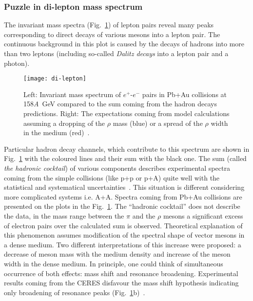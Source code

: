       \subsubsection{Puzzle in di-lepton mass spectrum}
        The invariant mass spectra (Fig.~\ref{fig:di-lepton}) of lepton pairs reveal many peaks corresponding to direct decays of various mesons into a lepton pair.
        The continuous background in this plot is caused by the decays of hadrons into more than two leptons (including so-called \textit{Dalitz decays} into a lepton pair and a photon).
        \begin{figure}[h]
          \centering
          \texttt{[image: di-lepton]}
          \caption{Left: Invariant mass spectrum of $e^{+}$-$e^{-}$ pairs in Pb+Au collisions at 158\textit{A}~GeV compared to the sum coming from the hadron decays predictions. Right: The expectations coming from model calculations assuming a dropping of the $\rho$ mass (blue) or a spread of the $\rho$ width in the medium (red)~\cite{marin}.}
          \label{fig:di-lepton}
        \end{figure}
        Particular hadron decay channels, which contribute to this spectrum are shown in Fig.~\ref{fig:di-lepton} with the coloured lines and their sum with the black one.
        The sum (called \textit{the hadronic cocktail}) of various components describes experimental spectra coming from the simple collisions (like p+p or p+A) quite well with the statistical and systematical uncertainties~\cite{bartke}.
        This situation is different considering more complicated systems i.e. A+A.
        Spectra coming from Pb+Au collisions are presented on the plots in the Fig.~\ref{fig:di-lepton}.
        The ``hadronic cocktail'' does not describe the data, in the mass range between the $\pi$ and the $\rho$ mesons a significant excess of electron pairs over the calculated sum is observed.
        Theoretical explanation of this phenomenon assumes modification of the spectral shape of vector mesons in a dense medium.
        Two different interpretations of this increase were proposed: a decrease of meson mass with the medium density and increase of the meson width in the dense medium.
        In principle, one could think of simultaneous occurrence of both effects: mass shift and resonance broadening.
        Experimental results coming from the CERES disfavour the mass shift hypothesis indicating only broadening of resonance peaks (Fig.~\ref{fig:di-lepton}b)~\cite{bartke}.

